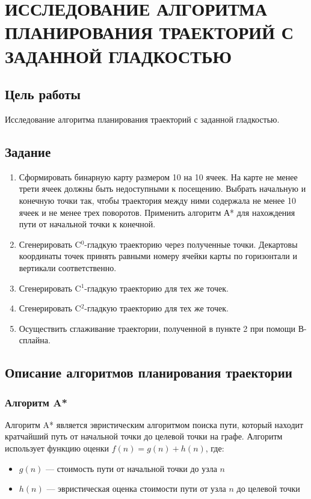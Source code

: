 \chapter{ИССЛЕДОВАНИЕ АЛГОРИТМА ПЛАНИРОВАНИЯ ТРАЕКТОРИЙ С ЗАДАННОЙ ГЛАДКОСТЬЮ}

\section{Цель работы}

Исследование алгоритма планирования траекторий с заданной гладкостью.

\section{Задание}

\begin{enumerate}
\item Сформировать бинарную карту размером 10 на 10 ячеек. На карте не менее трети ячеек должны быть недоступными к посещению. Выбрать начальную и конечную точки так, чтобы траектория между ними содержала не менее 10 ячеек и не менее трех поворотов. Применить алгоритм А* для нахождения пути от начальной точки к конечной.

\item Сгенерировать C$^0$-гладкую траекторию через полученные точки. Декартовы координаты точек принять равными номеру ячейки карты по горизонтали и вертикали соответственно.

\item Сгенерировать C$^1$-гладкую траекторию для тех же точек.

\item Сгенерировать C$^2$-гладкую траекторию для тех же точек.

\item Осуществить сглаживание траектории, полученной в пункте 2 при помощи В-сплайна.
\end{enumerate}

\section{Описание алгоритмов планирования траектории}

\subsection{Алгоритм A*}

Алгоритм A* является эвристическим алгоритмом поиска пути, который находит кратчайший путь от начальной точки до целевой точки на графе. Алгоритм использует функцию оценки $f(n) = g(n) + h(n)$, где:
\begin{itemize}
\item $g(n)$ --- стоимость пути от начальной точки до узла $n$
\item $h(n)$ --- эвристическая оценка стоимости пути от узла $n$ до целевой точки
\end{itemize}

